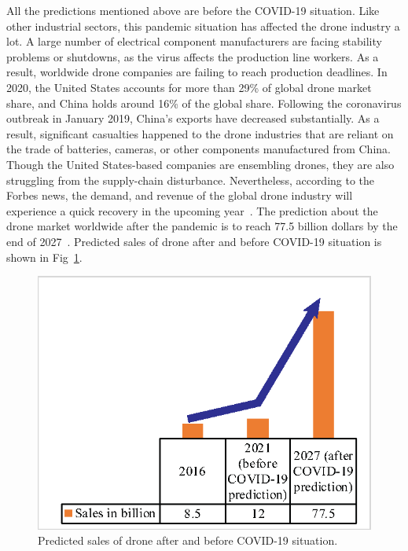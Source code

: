 All the predictions mentioned above are before the COVID-19 situation. Like other industrial sectors, this pandemic situation has affected the drone industry a lot. A large number of electrical component manufacturers are facing stability problems or shutdowns, as the virus affects the production line workers. As a result, worldwide drone companies are failing to reach production deadlines. In 2020, the United States accounts for more than 29\% of global drone market share, and China holds around 16\% of the global share. Following the coronavirus outbreak in January 2019, China's exports have decreased substantially. As a result, significant casualties happened to the drone industries that are reliant on the trade of batteries, cameras, or other components manufactured from China. Though the United States-based companies are ensembling drones, they are also struggling from the supply-chain disturbance. Nevertheless, according to the Forbes news, the demand, and revenue of the global drone industry will experience a quick recovery in the upcoming year~\cite{droneforbes}. The prediction about the drone market worldwide after the pandemic is to reach 77.5 billion dollars by the end of 2027~\cite{droneglobenewswire}. Predicted sales of drone after and before COVID-19 situation is shown in Fig~\ref{dronesale}.
\begin{figure}[h!]
\centering
\includegraphics[width=.8\linewidth]{figure/dronesale.eps}
\caption{Predicted sales of drone after and before COVID-19 situation.}
\label{dronesale}
\end{figure}